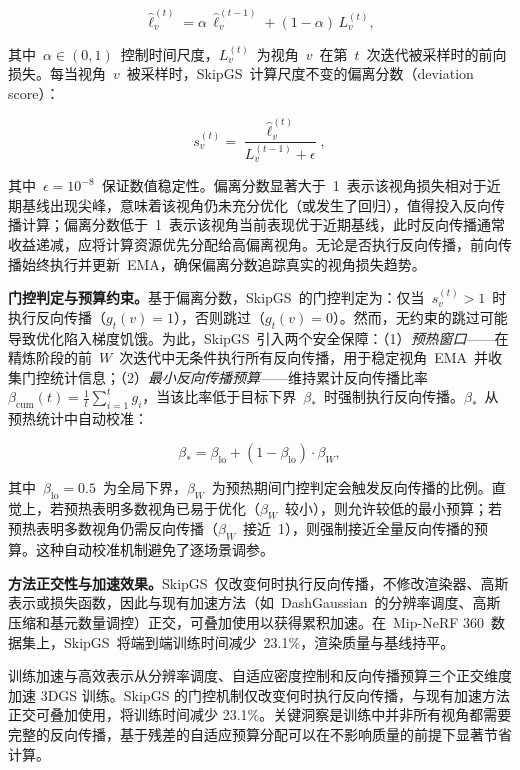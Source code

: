 \begin{equation}
    \hat{\ell}_v^{(t)} = \alpha\, \hat{\ell}_v^{(t-1)} + (1-\alpha)\, L_v^{(t)},
\end{equation}

其中~$\alpha \in (0,1)$~控制时间尺度，$L_v^{(t)}$~为视角~$v$~在第~$t$~次迭代被采样时的前向损失。每当视角~$v$~被采样时，SkipGS~计算尺度不变的偏离分数（deviation score）：

\begin{equation}
    s_v^{(t)} = \frac{\hat{\ell}_v^{(t)}}{L_v^{(t-1)} + \epsilon},
\end{equation}

其中~$\epsilon = 10^{-8}$~保证数值稳定性。偏离分数显著大于~1~表示该视角损失相对于近期基线出现尖峰，意味着该视角仍未充分优化（或发生了回归），值得投入反向传播计算；偏离分数低于~1~表示该视角当前表现优于近期基线，此时反向传播通常收益递减，应将计算资源优先分配给高偏离视角。无论是否执行反向传播，前向传播始终执行并更新~EMA，确保偏离分数追踪真实的视角损失趋势。

\textbf{门控判定与预算约束。}基于偏离分数，SkipGS~的门控判定为：仅当~$s_v^{(t)} > 1$~时执行反向传播（$g_t(v)=1$），否则跳过（$g_t(v)=0$）。然而，无约束的跳过可能导致优化陷入梯度饥饿。为此，SkipGS~引入两个安全保障：（1）\emph{预热窗口}——在精炼阶段的前~$W$~次迭代中无条件执行所有反向传播，用于稳定视角~EMA~并收集门控统计信息；（2）\emph{最小反向传播预算}——维持累计反向传播比率~$\beta_{\text{cum}}(t) = \frac{1}{t}\sum_{i=1}^{t} g_i$，当该比率低于目标下界~$\beta_*$~时强制执行反向传播。$\beta_*$~从预热统计中自动校准：

\begin{equation}
    \beta_* = \beta_{\text{lo}} + (1 - \beta_{\text{lo}}) \cdot \beta_W,
\end{equation}

其中~$\beta_{\text{lo}} = 0.5$~为全局下界，$\beta_W$~为预热期间门控判定会触发反向传播的比例。直觉上，若预热表明多数视角已易于优化（$\beta_W$~较小），则允许较低的最小预算；若预热表明多数视角仍需反向传播（$\beta_W$~接近~1），则强制接近全量反向传播的预算。这种自动校准机制避免了逐场景调参。

\textbf{方法正交性与加速效果。}SkipGS~仅改变何时执行反向传播，不修改渲染器、高斯表示或损失函数，因此与现有加速方法（如~DashGaussian~的分辨率调度、高斯压缩和基元数量调控）正交，可叠加使用以获得累积加速。在~Mip-NeRF 360~数据集上，SkipGS~将端到端训练时间减少~23.1\%，渲染质量与基线持平。

\begin{takeaway}
训练加速与高效表示从分辨率调度、自适应密度控制和反向传播预算三个正交维度加速 3DGS 训练。SkipGS 的门控机制仅改变何时执行反向传播，与现有加速方法正交可叠加使用，将训练时间减少 23.1\%。关键洞察是训练中并非所有视角都需要完整的反向传播，基于残差的自适应预算分配可以在不影响质量的前提下显著节省计算。
\end{takeaway}



